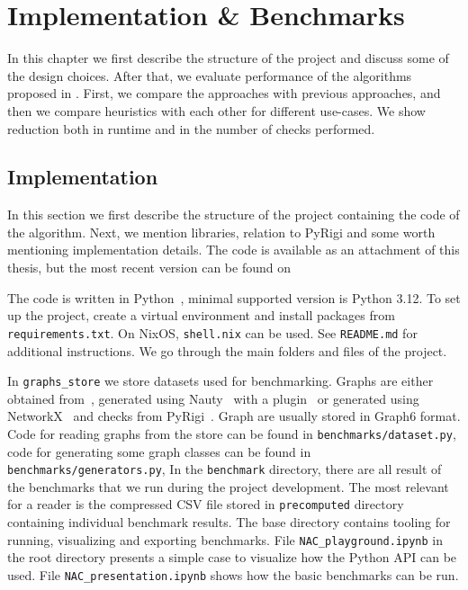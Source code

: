 \chapter{Implementation \& Benchmarks}%
\label{chapter:benchmarks}

\begin{chapterabstract}

	In this chapter we first describe the structure of the project
	and discuss some of the design choices.
	After that, we evaluate performance of the algorithms
	proposed in .
	First, we compare the approaches with previous approaches,
	and then we compare heuristics with each other
	for different use-cases.
	We show reduction both in runtime and in the number
	of \IsNACColoring{} checks performed.

\end{chapterabstract}

\section{Implementation}

In this section we first describe the structure of the project containing
the code of the algorithm.
Next, we mention libraries, relation to PyRigi and
some worth mentioning implementation details.
The code is available as an attachment of this thesis,
but the most recent version can be found on

The code is written in Python~\cite{python}, minimal supported version is Python 3.12.
To set up the project, create a virtual environment and install packages
from \texttt{requirements.txt}. On NixOS, \texttt{shell.nix} can be used.
See \texttt{README.md} for additional instructions.
We go through the main folders and files of the project.

In \texttt{graphs\_store} we store datasets used for benchmarking.
Graphs are either obtained from~\cite{extremal_graphs},
generated using Nauty~\cite{nauty} with a plugin~\cite{nauty_plugin}
or generated using NetworkX~\cite{networkx} and checks from PyRigi~\cite{pyrigi}.
Graph are usually stored in Graph6 format.
Code for reading graphs from the store can be found in \texttt{benchmarks/dataset.py},
code for generating some graph classes can be found in  \texttt{benchmarks/generators.py},
In the \texttt{benchmark} directory, there are all result of the benchmarks that we run
during the project development. The most relevant for a reader is the compressed CSV file
stored in \texttt{precomputed} directory containing individual benchmark results.
The base directory contains tooling for running, visualizing and exporting benchmarks.
File \texttt{NAC\_playground.ipynb} in the root directory presents a simple case
to visualize how the Python API can be used.
File \texttt{NAC\_presentation.ipynb} shows how the basic benchmarks can be run.

